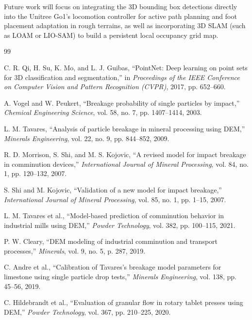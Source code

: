 \documentclass[a4paper,twocolumn]{article}
\begin{document}
Future work will focus on integrating the 3D bounding box detections directly into the Unitree Go1's locomotion controller for active path planning and foot placement adaptation in rough terrains, as well as incorporating 3D SLAM (such as LOAM or LIO-SAM) to build a persistent local occupancy grid map.


\begin{thebibliography}{99}

C. R. Qi, H. Su, K. Mo, and L. J. Guibas, ``PointNet: Deep learning on point sets for 3D classification and segmentation,'' in \emph{Proceedings of the IEEE Conference on Computer Vision and Pattern Recognition (CVPR)}, 2017, pp. 652--660.

A. Vogel and W. Peukert, ``Breakage probability of single particles by impact,'' \emph{Chemical Engineering Science}, vol. 58, no. 7, pp. 1407--1414, 2003.

L. M. Tavares, ``Analysis of particle breakage in mineral processing using DEM,'' \emph{Minerals Engineering}, vol. 22, no. 9, pp. 844--852, 2009.

R. D. Morrison, S. Shi, and M. S. Kojovic, ``A revised model for impact breakage in comminution devices,'' \emph{International Journal of Mineral Processing}, vol. 84, no. 1, pp. 120--132, 2007.

S. Shi and M. Kojovic, ``Validation of a new model for impact breakage,'' \emph{International Journal of Mineral Processing}, vol. 85, no. 1, pp. 1--15, 2007.

L. M. Tavares et al., ``Model-based prediction of comminution behavior in industrial mills using DEM,'' \emph{Powder Technology}, vol. 382, pp. 100--115, 2021.

P. W. Cleary, ``DEM modeling of industrial comminution and transport processes,'' \emph{Minerals}, vol. 9, no. 5, p. 287, 2019.

C. Andre et al., ``Calibration of Tavares's breakage model parameters for limestone using single particle drop tests,'' \emph{Minerals Engineering}, vol. 138, pp. 45--56, 2019.

C. Hildebrandt et al., ``Evaluation of granular flow in rotary tablet presses using DEM,'' \emph{Powder Technology}, vol. 367, pp. 210--225, 2020.

\end{thebibliography}
\end{document}
